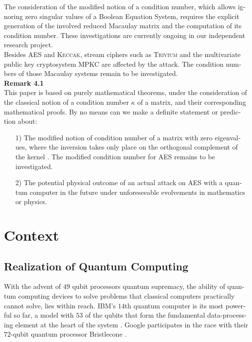 \documentclass[a4paper,11pt]{article}
\begin{document}
\begin{otherlanguage}{english}
\noindent
The consideration of the modified notion of a condition number, which allows ignoring zero singular values of a Boolean Equation System, requires the explicit generation of the involved reduced Macaulay matrix and the computation of its condition number. These investigations are currently ongoing in our independent research project. \\

\noindent
Besides \textsc{AES} and \textsc{Keccak}, stream ciphers such as \textsc{Trivium} and the multivariate public key cryptosystem \textsc{MPKC} are affected by the attack. The condition numbers of those Macaulay systems remain to be investigated.\\

\noindent
\textbf{Remark 4.1} \\
This paper is based on purely mathematical theorems, under the consideration of the classical notion of a condition number $\kappa$ of a matrix, and their corresponding mathematical proofs. By no means can we make a definite statement or prediction about: \\

\begin{itemize} [noitemsep, nolistsep]
  \item[1)] The modified notion of condition number of a matrix with zero eigenvalues, where the inversion takes only place on the orthogonal complement of the kernel \cite{SCH}. The modified condition number for \textsc{AES} remains to be investigated.
  \vspace{0.1cm}
  \item[2)] The potential physical outcome of an actual attack on \textsc{AES} with a quantum computer in the future under unforeseeable evolvements in mathematics or physics.\\
  \vspace{0.1cm}
\end{itemize}
\vspace{0.5cm}


\section{Context}

\subsection{Realization of Quantum Computing}

\noindent
With the advent of $49$ qubit processors quantum supremacy, the ability of quantum computing devices to solve problems that classical computers practically cannot solve,  lies within reach. IBM's $14$th quantum computer is its most powerful so far, a model with $53$ of the qubits that form the fundamental data-processing element at the heart of the system \cite{MSN}. Google participates in the race with their $72$-qubit quantum processor Bristlecone \cite{googleai}. \\


\end{otherlanguage}
\end{document}
